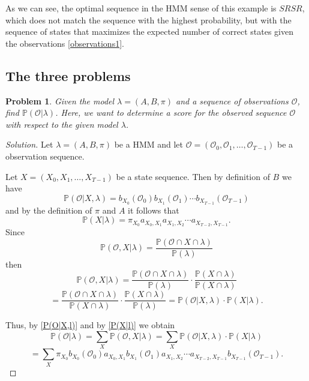 \documentclass[12pt]{article}
\newtheorem{problem}{Problem}
\newenvironment{solution}
  {\renewcommand\qedsymbol{$\blacksquare$}\begin{proof}[Solution]}
  {\end{proof}}
\def\OO{\mathcal{O}}
\def\PP{\mathbb{P}}
\numberwithin{equation}{section}
\begin{document}
As we can see, the optimal sequence in the HMM sense of this example is $SRSR$, which does not match the sequence with the highest probability, but with the sequence of states that maximizes the expected number of correct states given the observations \ref{observations1}.


\subsection{The three problems}

\begin{problem}\label{Problem 1}
    Given the model $\lambda = (A, B, \pi)$ and a sequence of observations $\OO$, find $\PP(\OO|\lambda)$. Here, we want to determine a score for the observed sequence $\OO$ with respect to the given model $\lambda$.
\end{problem}

\begin{solution}
Let $\lambda = (A,B,\pi)$ be a HMM and let $\OO = (\OO_{0}, \OO_{1}, \dots, \OO_{T-1})$ be a observation sequence.

Let $X = (X_{0}, X_{1}, \dots, X_{T-1})$ be a state sequence. Then by definition of $B$ we have
\begin{equation}\label{P(O|X,l)}
    \PP(\OO|X,\lambda) = b_{X_{0}}(\OO_{0}) b_{X_{1}}(\OO_{1}) \cdots b_{X_{T-1}}(\OO_{T-1})
\end{equation}
and by the definition of $\pi$ and $A$ it follows that
\begin{equation}\label{P(X|l)}
    \PP(X|\lambda) = \pi_{X_{0}} a_{X_{0}, X_{1}} a_{X_{1}, X_{2}} \cdots a_{X_{T-2}, X_{T-1}}.
\end{equation}
Since \[\PP(\OO,X|\lambda) = \frac{\PP(\OO \cap X \cap \lambda)}{\PP(\lambda)}\] then
\[\PP(\OO,X|\lambda) = \frac{\PP(\OO \cap X \cap \lambda)}{\PP(\lambda)} \cdot \frac{\PP(X \cap \lambda)}{\PP(X \cap \lambda)}\]
\[= \frac{\PP(\OO \cap X \cap \lambda)}{\PP(X \cap \lambda)} \cdot \frac{\PP(X \cap \lambda)}{\PP(\lambda)} = \PP(\OO|X,\lambda) \cdot \PP(X|\lambda).\]

Thus, by \ref{P(O|X,l)} and by \ref{P(X|l)} we obtain
\[\PP(\OO|\lambda) = \sum_{X}\PP(\OO,X|\lambda) = \sum_{X}\PP(\OO|X,\lambda) \cdot \PP(X|\lambda)\]
\begin{equation}\label{P(O|l)}
= \sum_{X} \pi_{X_{0}} b_{X_{0}}(\OO_{0}) a_{X_{0}, X_{1}} b_{X_{1}}(\OO_{1}) a_{X_{1}, X_{2}} \cdots a_{X_{T-2}, X_{T-1}} b_{X_{T-1}}(\OO_{T-1}).
\end{equation}
\end{solution}
\end{document}
